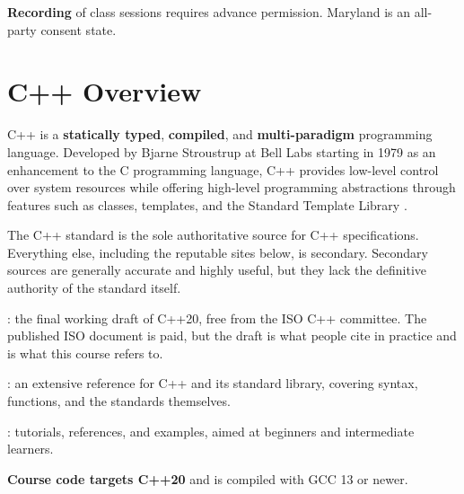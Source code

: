 \documentclass[
    10pt,
    dvipsnames,
    svgnames,
    x11names,
    aspectratio=1610,
    english,
    codeminted]{beamer}
\begin{document}
\begin{frame}{\secname}
\medskip
\begin{MyBox}
\footnotesize
\textbf{Recording} of class sessions requires advance permission. Maryland is an all-party consent state.
\end{MyBox}
\end{frame}
\endgroup



\section{C++ Overview}
\begingroup
{}
\begin{frame}
  \secdivheader{\secname}
C++ is a \textbf{statically typed}, \textbf{compiled}, and \textbf{multi-paradigm} programming language. Developed by Bjarne Stroustrup at Bell Labs starting in 1979 as an enhancement to the C programming language, C++ provides low-level control over system resources while offering high-level programming abstractions through features such as classes, templates, and the Standard Template Library \cite{stroustrup2013cpp}.

\begin{compactitem}
    \item The C++ standard is the sole authoritative source for C++ specifications. Everything else, including the reputable sites below, is secondary. Secondary sources are generally accurate and highly useful, but they lack the definitive authority of the standard itself.
    \item {}: the final working draft of C++20, free from the ISO C++ committee. The published ISO document is paid, but the draft is what people cite in practice and is what this course refers to.
    \item {}: an extensive reference for C++ and its standard library, covering syntax, functions, and the standards themselves.
    \item {}: tutorials, references, and examples, aimed at beginners and intermediate learners.
\end{compactitem}

\medskip
\begin{MyBox}
\textbf{Course code targets C++20} and is compiled with GCC 13 or newer.
\end{MyBox}
\end{frame}
\endgroup
\end{document}
